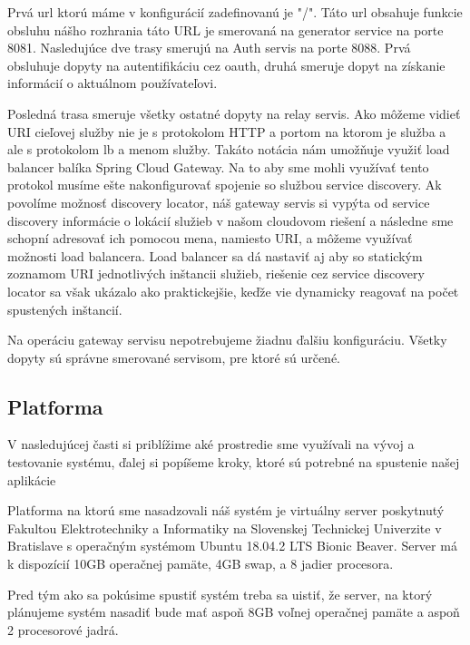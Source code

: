 Prvá \acrshort{url} ktorú máme v konfigurácií zadefinovanú je "/". Táto \acrshort{url} obsahuje funkcie obsluhu nášho rozhrania táto URL je smerovaná na generator service na porte 8081.
Nasledujúce dve trasy smerujú na Auth servis na porte 8088. Prvá obsluhuje dopyty na autentifikáciu cez \acrshort{oauth}, druhá smeruje dopyt na získanie informácií o aktuálnom používateľovi.

Posledná trasa smeruje všetky ostatné dopyty na relay servis. Ako môžeme vidieť URI cieľovej služby nie je s protokolom HTTP a portom na ktorom je služba a ale s protokolom lb a menom služby. Takáto notácia nám umožňuje využiť load balancer balíka Spring Cloud Gateway. Na to aby sme mohli využívať tento protokol musíme ešte nakonfigurovať spojenie so službou service discovery. Ak povolíme možnosť discovery locator, náš gateway servis si vypýta od service discovery informácie o lokácií služieb v našom cloudovom riešení a následne sme schopní adresovať ich pomocou mena, namiesto URI, a môžeme využívať možnosti load balancera. Load balancer sa dá nastaviť aj aby so statickým zoznamom URI jednotlivých inštancii služieb, riešenie cez service discovery locator sa však ukázalo ako praktickejšie, keďže vie dynamicky reagovať na počet spustených inštancií.

Na operáciu gateway servisu nepotrebujeme žiadnu ďalšiu konfiguráciu. Všetky dopyty sú správne smerované servisom, pre ktoré sú určené.

\subsection{Platforma}
V nasledujúcej časti si priblížime aké prostredie sme využívali na vývoj a testovanie systému, ďalej si popíšeme kroky, ktoré sú potrebné na spustenie našej aplikácie

Platforma na ktorú sme nasadzovali náš systém je virtuálny server poskytnutý Fakultou Elektrotechniky a Informatiky na Slovenskej Technickej Univerzite v Bratislave s operačným systémom Ubuntu 18.04.2 LTS Bionic Beaver. Server má k dispozícií 10GB operačnej pamäte, 4GB swap, a 8 jadier procesora.

Pred tým ako sa pokúsime spustiť systém treba sa uistiť, že server, na ktorý plánujeme systém nasadiť bude mať aspoň 8GB voľnej operačnej pamäte a aspoň 2 procesorové jadrá.

